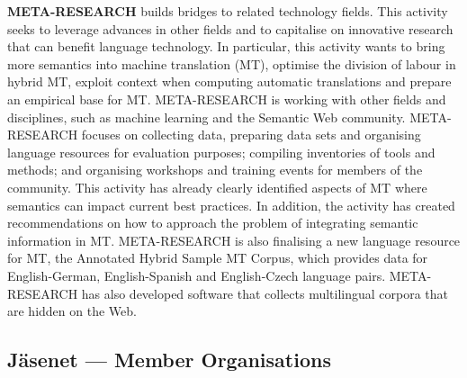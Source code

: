 \documentclass[]{../../metanetpaper}
\begin{document}
\begin{Parallel}[c]{70mm}{70mm}
{\textbf{META-RESEARCH} builds bridges to related technology
fields. This activity seeks to leverage advances in other fields and
to capitalise on innovative research that can benefit language
technology. In particular, this activity wants to bring more semantics
into machine translation (MT), optimise the division of labour in
hybrid MT, exploit context when computing automatic translations and
prepare an empirical base for MT. META-RESEARCH is working with other
fields and disciplines, such as machine learning and the Semantic Web
community.  META-RESEARCH focuses on collecting data, preparing data
sets and organising language resources for evaluation purposes;
compiling inventories of tools and methods; and organising workshops
and training events for members of the community. This activity has
already clearly identified aspects of MT where semantics can impact
current best practices. In addition, the activity has created
recommendations on how to approach the problem of integrating semantic
information in MT. META-RESEARCH is also finalising a new language
resource for MT, the Annotated Hybrid Sample MT Corpus, which provides
data for English-German, English-Spanish and English-Czech language
pairs. META-RESEARCH has also developed software that collects
multilingual corpora that are hidden on the Web.
}

\ParallelPar

\subsection{Jäsenet --- Member Organisations}



\ParallelPar



\end{Parallel}
\end{document}
